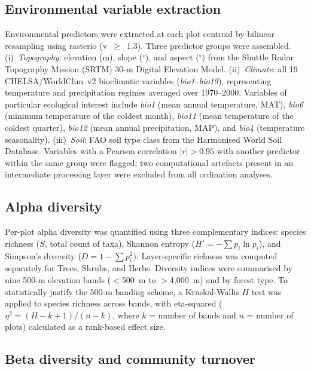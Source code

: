 \documentclass[review,12pt,a4paper]{elsarticle}
\begin{document}
\subsection{Environmental variable extraction}
\label{sec:env_extract}

Environmental predictors were extracted at each plot centroid by bilinear
resampling using rasterio (v~$\geq$~1.3). Three predictor groups were
assembled. (i)~\textit{Topography}: elevation (m), slope ($^\circ$), and
aspect ($^\circ$) from the Shuttle Radar Topography Mission (SRTM) 30-m
Digital Elevation Model. (ii)~\textit{Climate}: all 19 CHELSA/WorldClim~v2
bioclimatic variables (\textit{bio1}--\textit{bio19}), representing
temperature and precipitation regimes averaged over 1970--2000. Variables of
particular ecological interest include \textit{bio1} (mean annual temperature,
MAT), \textit{bio6} (minimum temperature of the coldest month),
\textit{bio11} (mean temperature of the coldest quarter), \textit{bio12}
(mean annual precipitation, MAP), and \textit{bio4} (temperature
seasonality). (iii)~\textit{Soil}: FAO soil type class from the Harmonised
World Soil Database. Variables with a Pearson correlation $|r|>0.95$ with
another predictor within the same group were flagged; two computational
artefacts present in an intermediate processing layer were excluded from all
ordination analyses.

\subsection{Alpha diversity}
\label{sec:alpha_div}

Per-plot alpha diversity was quantified using three complementary indices:
species richness ($S$, total count of taxa), Shannon entropy
($H' = -\sum p_i \ln p_i$), and Simpson's diversity
($D = 1 - \sum p_i^2$). Layer-specific richness was computed separately for
Trees, Shrubs, and Herbs. Diversity indices were summarised by nine 500-m
elevation bands ($<$500~m to $>$4{,}000~m) and by forest type. To
statistically justify the 500-m banding scheme, a Kruskal-Wallis $H$ test was
applied to species richness across bands, with eta-squared
($\eta^2 = (H - k + 1)/(n - k)$, where $k$ = number of bands and $n$ =
number of plots) calculated as a rank-based effect size.

\subsection{Beta diversity and community turnover}
\label{sec:beta_div}
\end{document}
